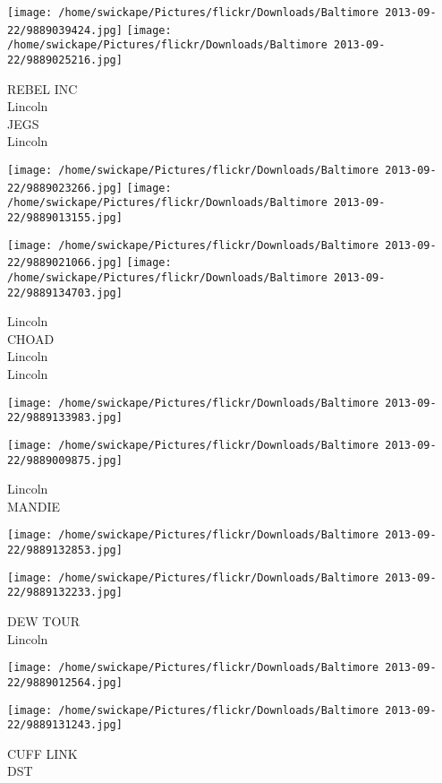 \documentclass[10pt,letterpaper]{article}
\begin{document}
\texttt{[image: /home/swickape/Pictures/flickr/Downloads/Baltimore 2013-09-22/9889039424.jpg]}
\texttt{[image: /home/swickape/Pictures/flickr/Downloads/Baltimore 2013-09-22/9889025216.jpg]}

REBEL INC\\
Lincoln\\
JEGS\\
Lincoln
\pagebreak

\texttt{[image: /home/swickape/Pictures/flickr/Downloads/Baltimore 2013-09-22/9889023266.jpg]}
\texttt{[image: /home/swickape/Pictures/flickr/Downloads/Baltimore 2013-09-22/9889013155.jpg]}

\texttt{[image: /home/swickape/Pictures/flickr/Downloads/Baltimore 2013-09-22/9889021066.jpg]}
\texttt{[image: /home/swickape/Pictures/flickr/Downloads/Baltimore 2013-09-22/9889134703.jpg]}

Lincoln\\
CHOAD\\
Lincoln\\
Lincoln
\pagebreak

\texttt{[image: /home/swickape/Pictures/flickr/Downloads/Baltimore 2013-09-22/9889133983.jpg]}

\vspace{0.25in}
\texttt{[image: /home/swickape/Pictures/flickr/Downloads/Baltimore 2013-09-22/9889009875.jpg]}

Lincoln\\
MANDIE
\pagebreak

\texttt{[image: /home/swickape/Pictures/flickr/Downloads/Baltimore 2013-09-22/9889132853.jpg]}

\vspace{0.25in}
\texttt{[image: /home/swickape/Pictures/flickr/Downloads/Baltimore 2013-09-22/9889132233.jpg]}

DEW TOUR\\
Lincoln
\pagebreak

\texttt{[image: /home/swickape/Pictures/flickr/Downloads/Baltimore 2013-09-22/9889012564.jpg]}

\vspace{0.25in}
\texttt{[image: /home/swickape/Pictures/flickr/Downloads/Baltimore 2013-09-22/9889131243.jpg]}

CUFF LINK\\
DST
\pagebreak
\end{document}
